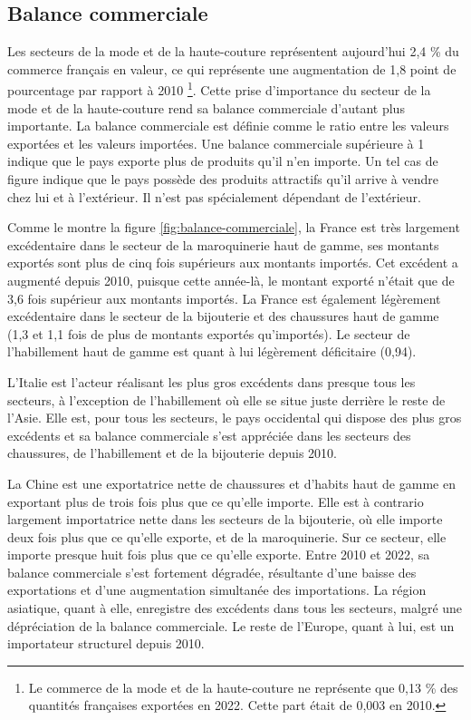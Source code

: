 \documentclass[french,10pt,a4paper]{article}
\begin{document}
\subsection{Balance commerciale}
Les secteurs de la mode et de la haute-couture représentent aujourd'hui 2,4 \% du commerce français en valeur, ce qui représente une augmentation de 1,8 point de pourcentage par rapport à 2010 \footnote{Le commerce de la mode et de la haute-couture ne représente que 0,13 \% des quantités françaises exportées en 2022. Cette part était de 0,003 en 2010.}. Cette prise d'importance du secteur de la mode et de la haute-couture rend sa balance commerciale d'autant plus importante. La balance commerciale est définie comme le ratio entre les valeurs exportées et les valeurs importées. Une balance commerciale supérieure à 1 indique que le pays exporte plus de produits qu'il n'en importe. Un tel cas de figure indique que le pays possède des produits attractifs qu'il arrive à vendre chez lui et à l'extérieur. Il n'est pas spécialement dépendant de l'extérieur.

\bigskip

Comme le montre la figure \ref{fig:balance-commerciale}, la France est très largement excédentaire dans le secteur de la maroquinerie haut de gamme, ses montants exportés sont plus de cinq fois supérieurs aux montants importés. Cet excédent a augmenté depuis 2010, puisque cette année-là, le montant exporté n'était que de 3,6 fois supérieur aux montants importés. La France est également légèrement excédentaire dans le secteur de la bijouterie et des chaussures haut de gamme (1,3 et 1,1 fois de plus de montants exportés qu'importés). Le secteur de l'habillement haut de gamme est quant à lui légèrement déficitaire (0,94).

L'Italie est l'acteur réalisant les plus gros excédents dans presque tous les secteurs, à l'exception de l'habillement où elle se situe juste derrière le reste de l'Asie. Elle est, pour tous les secteurs, le pays occidental qui dispose des plus gros excédents et sa balance commerciale s'est appréciée dans les secteurs des chaussures, de l'habillement et de la bijouterie depuis 2010.

La Chine est une exportatrice nette de chaussures et d'habits haut de gamme en exportant plus de trois fois plus que ce qu'elle importe. Elle est à contrario largement importatrice nette dans les secteurs de la bijouterie, où elle importe deux fois plus que ce qu'elle exporte, et de la maroquinerie. Sur ce secteur, elle importe presque huit fois plus que ce qu'elle exporte. Entre 2010 et 2022, sa balance commerciale s'est fortement dégradée, résultante d'une baisse des exportations et d'une augmentation simultanée des importations. La région asiatique, quant à elle, enregistre des excédents dans tous les secteurs, malgré une dépréciation de la balance commerciale. Le reste de l'Europe, quant à lui, est un importateur structurel depuis 2010. 
\end{document}
